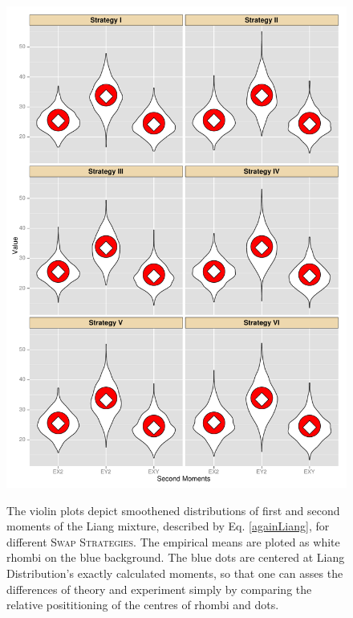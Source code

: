 \begin{figure}
\begin{minipage}[b]{.5\linewidth}
		\centering \includegraphics[width=\textwidth,keepaspectratio=TRUE]{./img/secondMomentsBaragatti.pdf}
	\label{secondMomentsBaragatti}
	\end{minipage}
	\caption[First and Second moments of the Liang Distribution approximations --- distributions represented by a violin-plot.]{
		The violin plots depict smoothened distributions of first and second moments of the Liang mixture, described by Eq. \ref{againLiang}, for different \textsc{Swap Strategies}. The empirical means are ploted as white rhombi on the blue background. The blue dots are centered at Liang Distribution's exactly calculated moments, so that one can asses the differences of theory and experiment simply by comparing the relative posititioning of the centres of rhombi and dots.
	}\label{momentsBaragatti}
\end{figure}
